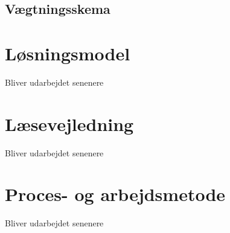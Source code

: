 \subsection{Vægtningsskema}

\section{Løsningsmodel}
Bliver udarbejdet senenere

\section{Læsevejledning}
Bliver udarbejdet senenere

\section{Proces- og arbejdsmetode}
Bliver udarbejdet senenere
